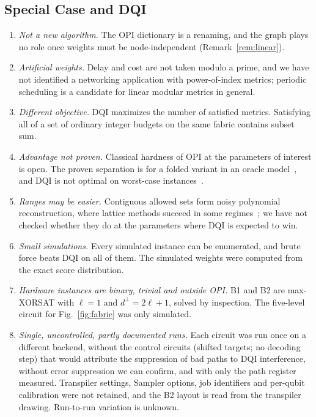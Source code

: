 \documentclass[journal]{IEEEtran}
\begin{document}
\subsection{Special Case and DQI}
\begin{enumerate}
  \item \emph{Not a new algorithm.} The OPI dictionary is a renaming, and the graph plays no role once weights must be node-independent (Remark~\ref{rem:linear}).
  \item \emph{Artificial weights.} Delay and cost are not taken modulo a prime, and we have not identified a networking application with power-of-index metrics; periodic scheduling is a candidate for linear modular metrics in general.
  \item \emph{Different objective.} DQI maximizes the number of satisfied metrics. Satisfying all of a set of ordinary integer budgets on the same fabric contains subset sum.
  \item \emph{Advantage not proven.} Classical hardness of OPI at the parameters of interest is open. The proven separation is for a folded variant in an oracle model~\cite{kramer2026}, and DQI is not optimal on worst-case instances~\cite{sun2026,horinaga2026}.
  \item \emph{Ranges may be easier.} Contiguous allowed sets form noisy polynomial reconstruction, where lattice methods succeed in some regimes~\cite{bleichenbacher2000}; we have not checked whether they do at the parameters where DQI is expected to win.
  \item \emph{Small simulations.} Every simulated instance can be enumerated, and brute force beats DQI on all of them. The simulated weights were computed from the exact score distribution.
  \item \emph{Hardware instances are binary, trivial and outside OPI.} B1 and B2 are max-XORSAT with $\ell=1$ and $d^{\perp}=2\ell+1$, solved by inspection. The five-level circuit for Fig.~\ref{fig:fabric} was only simulated.
  \item \emph{Single, uncontrolled, partly documented runs.} Each circuit was run once on a different backend, without the control circuits (shifted targets; no decoding step) that would attribute the suppression of bad paths to DQI interference, without error suppression we can confirm, and with only the path register measured. Transpiler settings, Sampler options, job identifiers and per-qubit calibration were not retained, and the B2 layout is read from the transpiler drawing. Run-to-run variation is unknown.
\end{enumerate}
\end{document}
